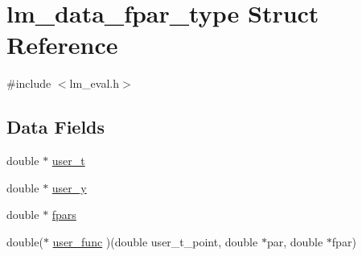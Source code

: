 \hypertarget{structlm__data__fpar__type}{
\section{lm\_\-data\_\-fpar\_\-type Struct Reference}
\label{structlm__data__fpar__type}
}


{\ttfamily \#include $<$lm\_\-eval.h$>$}\subsection*{Data Fields}
\begin{DoxyCompactItemize}
\item 
double $\ast$ \hyperlink{structlm__data__fpar__type_a38a73cc8ff86c59a2d63db46b8ab9811}{user\_\-t}
\item 
double $\ast$ \hyperlink{structlm__data__fpar__type_a1a8a39b4941a2ded8c96b9126240897d}{user\_\-y}
\item 
double $\ast$ \hyperlink{structlm__data__fpar__type_a4d2c4ce97947a43427dcb61fcd71b760}{fpars}
\item 
double($\ast$ \hyperlink{structlm__data__fpar__type_a8748ade3f240db82764c4a8eca132c51}{user\_\-func} )(double user\_\-t\_\-point, double $\ast$par, double $\ast$fpar)
\end{DoxyCompactItemize}


